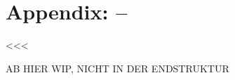 \documentclass[parskip, twoside, accentcolor=tud9b, colorback, breaklinks, noresetcounter, noheadingspace, pdfencoding=unicode, 11pt, bigchapter, numbersubsubsec, numbers=noenddot, linedtoc, longdoc]{tudreport}
\begin{document}
	
\pagestyle{plain}
\appendix
\newcommand{\hiddensection}[1]{
    \stepcounter{section}
    \section*{\Alph{chapter}.\arabic{section}\hspace{0.8em}{#1}}
}
\chapter{Appendix: --}<<<
%    



\newpage
{\Huge AB HIER WIP, NICHT IN DER ENDSTRUKTUR}
\newpage
    
%     
%     
%     
% 
% 	
% 	
% 	
% 	
	
	
	
\cleardoublepage

% 
\printbibliography
%
\cleardoublepage

\listoffigures
\cleardoublepage

\listoftables
\cleardoublepage
\end{document}
